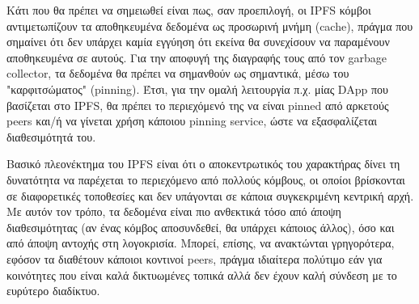 Κάτι που θα πρέπει να σημειωθεί είναι πως, σαν προεπιλογή, οι IPFS κόμβοι αντιμετωπίζουν τα αποθηκευμένα δεδομένα ως προσωρινή μνήμη (cache), πράγμα που σημαίνει ότι δεν υπάρχει καμία εγγύηση ότι εκείνα θα συνεχίσουν να παραμένουν αποθηκευμένα σε αυτούς. Για την αποφυγή της διαγραφής τους από τον garbage collector, τα δεδομένα θα πρέπει να σημανθούν ως σημαντικά, μέσω του "καρφιτσώματος" (pinning). Έτσι, για την ομαλή λειτουργία π.χ. μίας DApp που βασίζεται στο IPFS, θα πρέπει το περιεχόμενό της να είναι pinned από αρκετούς peers και/ή να γίνεται χρήση κάποιου pinning service, ώστε να εξασφαλίζεται διαθεσιμότητά του.

Βασικό πλεονέκτημα του IPFS είναι ότι ο αποκεντρωτικός του χαρακτήρας δίνει τη δυνατότητα να παρέχεται το περιεχόμενο από πολλούς κόμβους, οι οποίοι βρίσκονται σε διαφορετικές τοποθεσίες και δεν υπάγονται σε κάποια συγκεκριμένη κεντρική αρχή. Με αυτόν τον τρόπο, τα δεδομένα είναι πιο ανθεκτικά τόσο από άποψη διαθεσιμότητας (αν ένας κόμβος αποσυνδεθεί, θα υπάρχει κάποιος άλλος), όσο και από άποψη αντοχής στη λογοκρισία. Μπορεί, επίσης, να ανακτώνται γρηγορότερα, εφόσον τα διαθέτουν κάποιοι κοντινοί peers, πράγμα ιδιαίτερα πολύτιμο εάν για κοινότητες που είναι καλά δικτυωμένες τοπικά αλλά δεν έχουν καλή σύνδεση με το ευρύτερο διαδίκτυο.